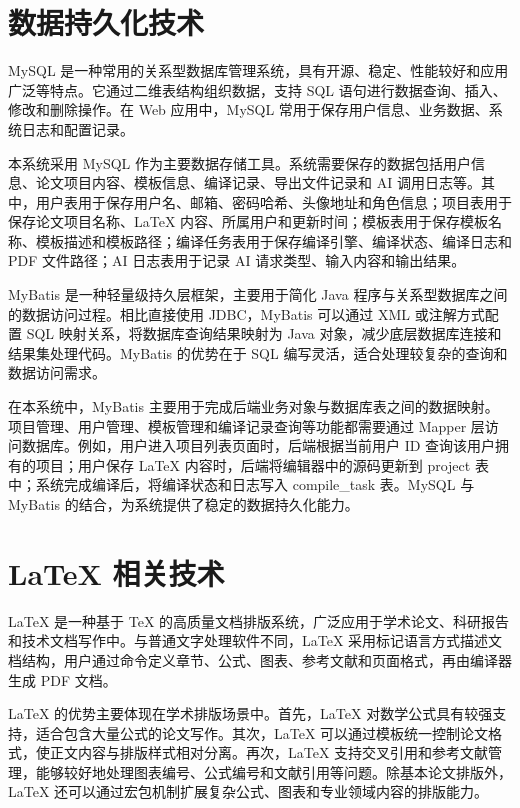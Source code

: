 \documentclass{xduugthesis}
\begin{document}
\section{数据持久化技术}
MySQL 是一种常用的关系型数据库管理系统，具有开源、稳定、性能较好和应用广泛等特点\cite{botros2021mysql}。它通过二维表结构组织数据，支持 SQL 语句进行数据查询、插入、修改和删除操作。在 Web 应用中，MySQL 常用于保存用户信息、业务数据、系统日志和配置记录。

本系统采用 MySQL 作为主要数据存储工具。系统需要保存的数据包括用户信息、论文项目内容、模板信息、编译记录、导出文件记录和 AI 调用日志等。其中，用户表用于保存用户名、邮箱、密码哈希、头像地址和角色信息；项目表用于保存论文项目名称、LaTeX 内容、所属用户和更新时间；模板表用于保存模板名称、模板描述和模板路径；编译任务表用于保存编译引擎、编译状态、编译日志和 PDF 文件路径；AI 日志表用于记录 AI 请求类型、输入内容和输出结果。

MyBatis 是一种轻量级持久层框架，主要用于简化 Java 程序与关系型数据库之间的数据访问过程\cite{reddy2013mybatis}。相比直接使用 JDBC，MyBatis 可以通过 XML 或注解方式配置 SQL 映射关系，将数据库查询结果映射为 Java 对象，减少底层数据库连接和结果集处理代码。MyBatis 的优势在于 SQL 编写灵活，适合处理较复杂的查询和数据访问需求。

在本系统中，MyBatis 主要用于完成后端业务对象与数据库表之间的数据映射。项目管理、用户管理、模板管理和编译记录查询等功能都需要通过 Mapper 层访问数据库。例如，用户进入项目列表页面时，后端根据当前用户 ID 查询该用户拥有的项目；用户保存 LaTeX 内容时，后端将编辑器中的源码更新到 project 表中；系统完成编译后，将编译状态和日志写入 compile\_task 表。MySQL 与 MyBatis 的结合，为系统提供了稳定的数据持久化能力。

\section{LaTeX 相关技术}
LaTeX 是一种基于 TeX 的高质量文档排版系统，广泛应用于学术论文、科研报告和技术文档写作中。与普通文字处理软件不同，LaTeX 采用标记语言方式描述文档结构，用户通过命令定义章节、公式、图表、参考文献和页面格式，再由编译器生成 PDF 文档\cite{knuth1984texbook}。

LaTeX 的优势主要体现在学术排版场景中。首先，LaTeX 对数学公式具有较强支持，适合包含大量公式的论文写作\cite{ye2018latex}。其次，LaTeX 可以通过模板统一控制论文格式，使正文内容与排版样式相对分离。再次，LaTeX 支持交叉引用和参考文献管理，能够较好地处理图表编号、公式编号和文献引用等问题。除基本论文排版外，LaTeX 还可以通过宏包机制扩展复杂公式、图表和专业领域内容的排版能力\cite{strokov1998macropackage}。
\end{document}
